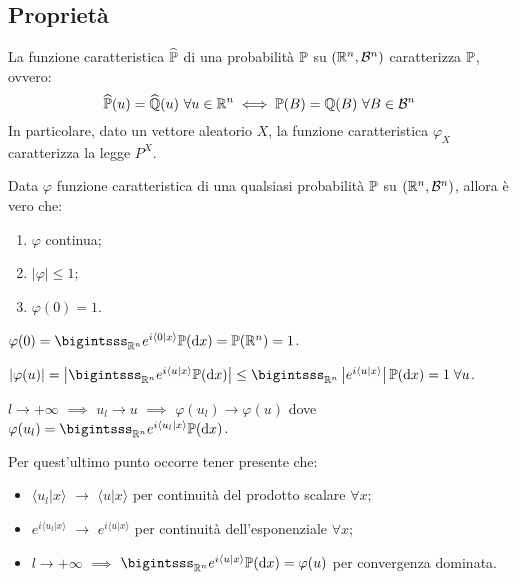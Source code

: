 \subsection{Proprietà}

\begin{teob}[\JPTh{14.1}]
  La funzione caratteristica $\widehat{\mathbb P}$ di una probabilità $\mathbb P$ su $(\mathbb R^n, \mathcal B^n)$ caratterizza $\mathbb P$, ovvero:
  $$\widehat{\PP}(u)=\widehat{\QQ}(u) \ \forall u \in \RR^n \iff \PP(B)=\QQ(B) \ \forall B \in \Bc^n$$
  In particolare, dato un vettore aleatorio $X$, la funzione caratteristica $\varphi_X$ caratterizza la legge $P^X$.
\end{teob}

\smallskip
\begin{teo}\label{teo-prop-analitiche-caratteristica}
  Data $\varphi$ funzione caratteristica di una qualsiasi probabilità $\mathbb P$ su $(\mathbb R^n, \mathcal B^n)$, allora è vero che:
  \begin{enumerate}
    \item $\varphi$ continua;
    \item $|\varphi| \leq 1$;
    \item $\varphi(0)=1$.
  \end{enumerate}
\end{teo}

\begin{dimo}
  \Fixvmode
  \begin{etaremune}
    \item $\varphi(0)=\bigintsss_{\RR^n}e^{i \langle 0|x\rangle}\PP(\dx)=\PP(\RR^n)=1$.
    \item $\abs{\varphi(u)}= \left| \bigintsss_{\RR^n}e^{i \langle u|x\rangle}\PP(\dx) \right| \leq \bigintsss_{\RR^n} \left| e^{i \langle u|x\rangle} \right| \PP(\dx)=1 \; \forall u$.
    \item $l\to +\infty$ $\implies$ $u_l\to u$ $\implies$ $\varphi(u_l)\to\varphi(u)$ dove $\varphi(u_l)=\bigintsss_{\RR^n}e^{i \langle u_l|x\rangle}\PP(\dx)$.

    Per quest'ultimo punto occorre tener presente che:
    \begin{itemize}
      \item $\langle u_l|x\rangle$ $\to$ $\langle u|x\rangle$ per continuità del prodotto scalare $\forall x$;
      \item $e^{i \langle u_l|x\rangle}$ $\to$ $e^{i \langle u|x\rangle}$ per continuità dell'esponenziale $\forall x$;
      \item $l\to +\infty$ $\implies$ $\bigintsss_{\RR^n}e^{i \langle u|x\rangle}\PP(\dx)=\varphi(u)$ per convergenza dominata. \qedhere
    \end{itemize}
  \end{etaremune}
\end{dimo}

